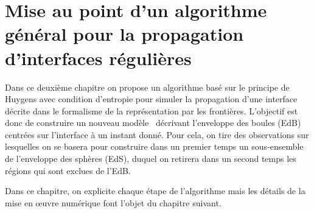 \chapter[Algorithme général pour la propagation d'interfaces $\contgeom{1}$ \piecewise]{Mise au point d'un algorithme général pour la propagation d'interfaces régulières \piecewise}
\label{chap:algo_general}



Dans ce deuxième chapitre on propose un algorithme basé sur le principe de Huygens avec condition d'entropie pour simuler la propagation d'une interface décrite dans le formalisme de la représentation par les frontières. 
L'objectif est donc de construire un nouveau modèle \brep\ décrivant l'enveloppe des boules (EdB) centrées sur l'interface à un instant donné.
Pour cela, on tire des observations sur lesquelles on se basera pour construire dans un premier temps un sous-ensemble de l'enveloppe des sphères (EdS), duquel on retirera dans un second temps les régions qui sont exclues de l'EdB.
\par
Dans ce chapitre, on explicite chaque étape de l'algorithme mais les détails de la mise en \oe uvre numérique font l'objet du chapitre suivant.





